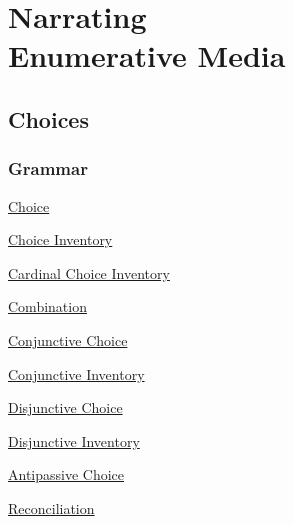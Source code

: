 \documentclass[twoside]{book}
\newlength{\hone}
\newlength{\htwo}
\newlength{\hthree}
\begin{document}
\part{\texorpdfstring{Narrating\\ Enumerative Media}{Narrating Enumerative Media}}
\chapter{Choices}

\section{Grammar}

\indent\hspace{\hone}\hypertarget{oChoice}{\hyperlink{Choice}{Choice}}

\hspace{\htwo}\hypertarget{oChoiceInventory}{\hyperlink{ChoiceInventory}{Choice Inventory}}

\hspace{\hthree}\hypertarget{oCardinalChoiceInventory}{\hyperlink{CardinalChoiceInventory}{Cardinal Choice Inventory}}

\hspace{\hone}\hypertarget{oCombination}{\hyperlink{Combination}{Combination}}

\hspace{\htwo}\hypertarget{oConjunctiveChoice}{\hyperlink{ConjunctiveChoice}{Conjunctive Choice}}

\hspace{\hthree}\hypertarget{oConjunctiveInventory}{\hyperlink{ConjunctiveInventory}{Conjunctive Inventory}}

\hspace{\htwo}\hypertarget{oDisjunctiveChoice}{\hyperlink{DisjunctiveChoice}{Disjunctive Choice}}

\hspace{\hthree}\hypertarget{oDisjunctiveInventory}{\hyperlink{DisjunctiveInventory}{Disjunctive Inventory}}

\hspace{\hone}\hypertarget{oAntipassiveChoice}{\hyperlink{AntipassiveChoice}{Antipassive Choice}}

\hspace{\hone}\hypertarget{oReconciliation}{\hyperlink{Reconciliation}{Reconciliation}}
\end{document}
